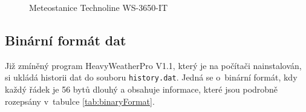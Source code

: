 \begin{figure}[h]
    \centering
	\caption{Meteostanice Technoline WS-3650-IT}
	\label{fig:stanice}
\end{figure}

\subsection{Binární formát dat}
Již zmíněný program HeavyWeatherPro V1.1, který je na počítači nainstalován, si ukládá historii dat do souboru \texttt{history.dat}. Jedná se o~binární formát, kdy každý řádek je 56 bytů dlouhý a obsahuje informace, které jsou podrobně rozepsány v~tabulce \ref{tab:binaryFormat}.

